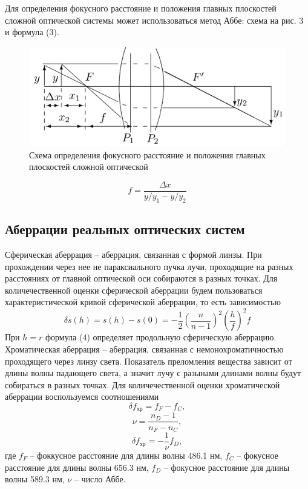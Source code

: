 \documentclass{astroedu-lab}
\begin{document}
\begin{problem}
\noindent
Для определения фокусного расстояние и положения главных плоскостей сложной оптической системы может использоваться метод Аббе: схема на рис. 3 и формула (3).

\begin{figure}[H]
    \centering
    \includegraphics[scale=0.3]{pic_3.png}
    \caption{Схема определения фокусного расстояние и положения главных плоскостей сложной оптической}
\end{figure}

\begin{equation}
    f = \frac{\Delta x}{y / y_1 - y / y_2}    
\end{equation}


\subsection*{Аберрации реальных оптических систем}
Сферическая аберрация -- аберрация, связанная с формой линзы. При прохождении через нее не параксиального пучка лучи, проходящие на разных расстояниях от главной оптической оси собираются в разных точках. Для количечественной оценки сферической аберрации будем пользоваться характеристической кривой сферической аберрации, то есть зависимостью 
\begin{equation}
    \delta s(h) = s(h) - s(0) = -\frac12 \left( \frac{n}{n - 1} \right)^2 \left( \frac{h}{f} \right)^2 f
\end{equation}
\noindent
При $h = r$ формула (4) определяет продольную сферическую аберрацию. \\
Хроматическая аберрация -- аберрация, связанная с немонохроматичностью проходящего через линзу света. Показатель преломления вещества зависит от длины волны падающего света, а значит лучу с разынами длинами волны будут собираться в разных точках. Для количечественной оценки хроматической аберрации воспользуемся соотношениями
\begin{equation}
    \delta f_\text{хр} = f_F - f_C,
\end{equation}
\begin{equation}
    \nu = \frac{n_D - 1}{n_F - n_C},
\end{equation}
\begin{equation}
    \delta f_\text{хр} = -\frac{1}{\nu} f_D,
\end{equation}
\noindent
где $f_F$ -- фоккусное расстояние для длины волны 486.1 нм, $f_C$ -- фокусное расстояние для длины волны 656.3 нм, $f_D$ -- фокусное расстояние для длины волны 589.3 нм, $\nu$ -- число Аббе.



\end{problem}
\end{document}
